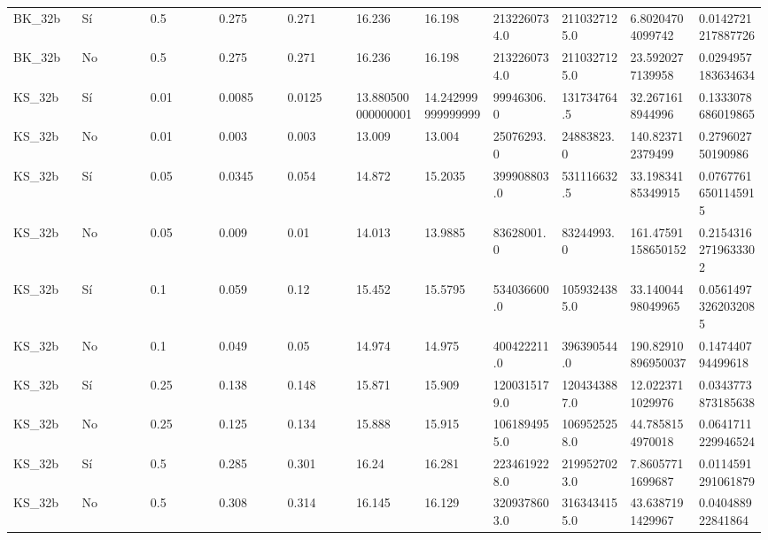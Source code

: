 {{\begin{longtable}{M{0.09\linewidth}M{0.09\linewidth}M{0.09\linewidth}M{0.09\linewidth}M{0.09\linewidth}M{0.09\linewidth}M{0.09\linewidth}M{0.09\linewidth}M{0.09\linewidth}M{0.09\linewidth}M{0.09\linewidth}}
BK\_32b & Sí & \num{0.5} & \num{0.275} & \num{0.271} & \num{16.236} & \num{16.198} & \num{2132260734.0} & \num{2110327125.0} & \num{6.80204704099742} & \num{0.0142721217887726} \\
BK\_32b & No & \num{0.5} & \num{0.275} & \num{0.271} & \num{16.236} & \num{16.198} & \num{2132260734.0} & \num{2110327125.0} & \num{23.5920277139958} & \num{0.0294957183634634} \\
KS\_32b & Sí & \num{0.01} & \num{0.0085} & \num{0.0125} & \num{13.880500000000001} & \num{14.242999999999999} & \num{99946306.0} & \num{131734764.5} & \num{32.2671618944996} & \num{0.1333078686019865} \\
KS\_32b & No & \num{0.01} & \num{0.003} & \num{0.003} & \num{13.009} & \num{13.004} & \num{25076293.0} & \num{24883823.0} & \num{140.823712379499} & \num{0.279602750190986} \\
KS\_32b & Sí & \num{0.05} & \num{0.0345} & \num{0.054} & \num{14.872} & \num{15.2035} & \num{399908803.0} & \num{531116632.5} & \num{33.19834185349915} & \num{0.07677616501145915} \\
KS\_32b & No & \num{0.05} & \num{0.009} & \num{0.01} & \num{14.013} & \num{13.9885} & \num{83628001.0} & \num{83244993.0} & \num{161.47591158650152} & \num{0.21543162719633302} \\
KS\_32b & Sí & \num{0.1} & \num{0.059} & \num{0.12} & \num{15.452} & \num{15.5795} & \num{534036600.0} & \num{1059324385.0} & \num{33.14004498049965} & \num{0.05614973262032085} \\
KS\_32b & No & \num{0.1} & \num{0.049} & \num{0.05} & \num{14.974} & \num{14.975} & \num{400422211.0} & \num{396390544.0} & \num{190.82910896950037} & \num{0.147440794499618} \\
KS\_32b & Sí & \num{0.25} & \num{0.138} & \num{0.148} & \num{15.871} & \num{15.909} & \num{1200315179.0} & \num{1204343887.0} & \num{12.0223711029976} & \num{0.0343773873185638} \\
KS\_32b & No & \num{0.25} & \num{0.125} & \num{0.134} & \num{15.888} & \num{15.915} & \num{1061894955.0} & \num{1069525258.0} & \num{44.7858154970018} & \num{0.0641711229946524} \\
KS\_32b & Sí & \num{0.5} & \num{0.285} & \num{0.301} & \num{16.24} & \num{16.281} & \num{2234619228.0} & \num{2199527023.0} & \num{7.86057711699687} & \num{0.0114591291061879} \\
KS\_32b & No & \num{0.5} & \num{0.308} & \num{0.314} & \num{16.145} & \num{16.129} & \num{3209378603.0} & \num{3163434155.0} & \num{43.6387191429967} & \num{0.040488922841864} \\

\end{longtable}}}
